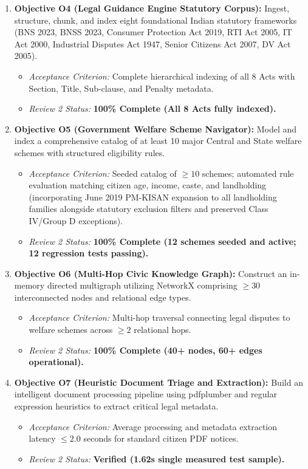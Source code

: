 \begin{enumerate}
    \item \textbf{Objective O4 (Legal Guidance Engine Statutory Corpus):} Ingest, structure, chunk, and index eight foundational Indian statutory frameworks (BNS 2023, BNSS 2023, Consumer Protection Act 2019, RTI Act 2005, IT Act 2000, Industrial Disputes Act 1947, Senior Citizens Act 2007, DV Act 2005).
    \begin{itemize}
        \item \textit{Acceptance Criterion:} Complete hierarchical indexing of all 8 Acts with Section, Title, Sub-clause, and Penalty metadata.
        \item \textit{Review 2 Status:} \textbf{100\% Complete (All 8 Acts fully indexed).}
    \end{itemize}

    \item \textbf{Objective O5 (Government Welfare Scheme Navigator):} Model and index a comprehensive catalog of at least 10 major Central and State welfare schemes with structured eligibility rules.
    \begin{itemize}
        \item \textit{Acceptance Criterion:} Seeded catalog of $\ge 10$ schemes; automated rule evaluation matching citizen age, income, caste, and landholding (incorporating June 2019 PM-KISAN expansion to all landholding families alongside statutory exclusion filters and preserved Class IV/Group D exceptions).
        \item \textit{Review 2 Status:} \textbf{100\% Complete (12 schemes seeded and active; 12 regression tests passing).}
    \end{itemize}

    \item \textbf{Objective O6 (Multi-Hop Civic Knowledge Graph):} Construct an in-memory directed multigraph utilizing NetworkX comprising $\ge 30$ interconnected nodes and relational edge types.
    \begin{itemize}
        \item \textit{Acceptance Criterion:} Multi-hop traversal connecting legal disputes to welfare schemes across $\ge 2$ relational hops.
        \item \textit{Review 2 Status:} \textbf{100\% Complete (40+ nodes, 60+ edges operational).}
    \end{itemize}

    \item \textbf{Objective O7 (Heuristic Document Triage and Extraction):} Build an intelligent document processing pipeline using pdfplumber and regular expression heuristics to extract critical legal metadata.
    \begin{itemize}
        \item \textit{Acceptance Criterion:} Average processing and metadata extraction latency $\le 2.0$ seconds for standard citizen PDF notices.
        \item \textit{Review 2 Status:} \textbf{Verified (1.62s single measured test sample).}
    \end{itemize}


\end{enumerate}
